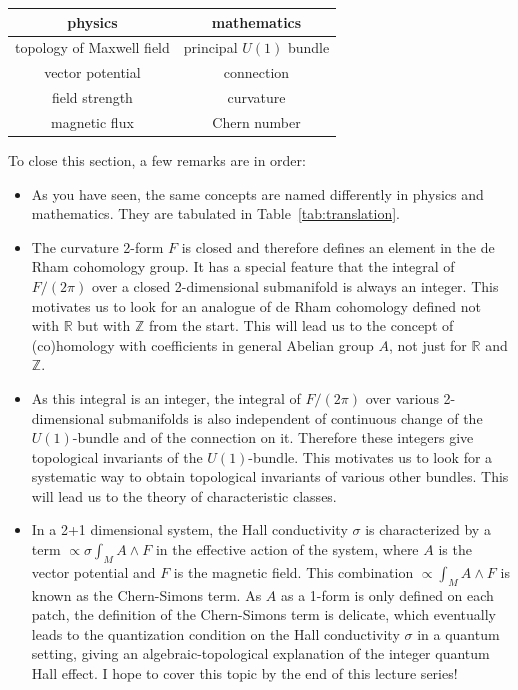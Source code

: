 \documentclass[12pt]{article}
\numberwithin{equation}{section}
\theoremstyle{remark}
\renewenvironment{table}[1][]{
  \begin{originaltable}[#1]
    \begin{mdframed}[linecolor=black!0,backgroundcolor=black!1]
}{
    \end{mdframed}
  \end{originaltable}
}
\def\bR{\mathbb{R}}
\def\bZ{\mathbb{Z}}
\begin{document}
\begin{table}[h]
\centering
\begin{tabular}{c|c}
physics & mathematics \\
\hline
topology of Maxwell field & principal $U(1)$ bundle \\
vector potential & connection \\
field strength & curvature\\
magnetic flux  & Chern number 
\end{tabular}
\caption{Translation table of terminologies \label{tab:translation}}
\end{table}


To close this section, a  few remarks are in order:
\begin{itemize}
\item As you have seen, the same concepts are named differently in physics and mathematics. 
They are tabulated in Table~\ref{tab:translation}.
\item The curvature 2-form $F$ is closed and therefore defines an element in the de Rham cohomology group.
It has a special feature that the integral of $F/(2\pi)$ over a closed 2-dimensional submanifold is always an integer.
This motivates us to look for an analogue of de Rham cohomology defined not with $\bR$ but with $\bZ$ from the start.
This will lead us to the concept of (co)homology with coefficients in general Abelian group $A$, not just for $\bR$ and $\bZ$.
\item As this integral is an integer, the integral of $F/(2\pi)$ over various 2-dimensional submanifolds is also independent of 
continuous change of the $U(1)$-bundle and of the connection on it.
Therefore these integers give topological invariants of the $U(1)$-bundle.
This motivates us to look for a systematic way to obtain topological invariants of various other bundles.
This will lead us to the theory of characteristic classes.
\item In a 2+1 dimensional system, 
the Hall conductivity $\sigma$ is characterized by a term 
$\propto \sigma \int_M A\wedge F$ in the effective action of the system,
where $A$ is the vector potential and $F$ is the magnetic field.
This combination $\propto \int_M A\wedge F$ is known as the Chern-Simons term.
As $A$ as a 1-form is only defined on each patch, the definition of the Chern-Simons term is delicate,
which eventually leads to the quantization condition on the Hall conductivity $\sigma$ in a quantum setting,
giving an algebraic-topological explanation of the integer quantum Hall effect.
I hope to cover this  topic by the end of this lecture series!
\end{itemize}
\end{document}
